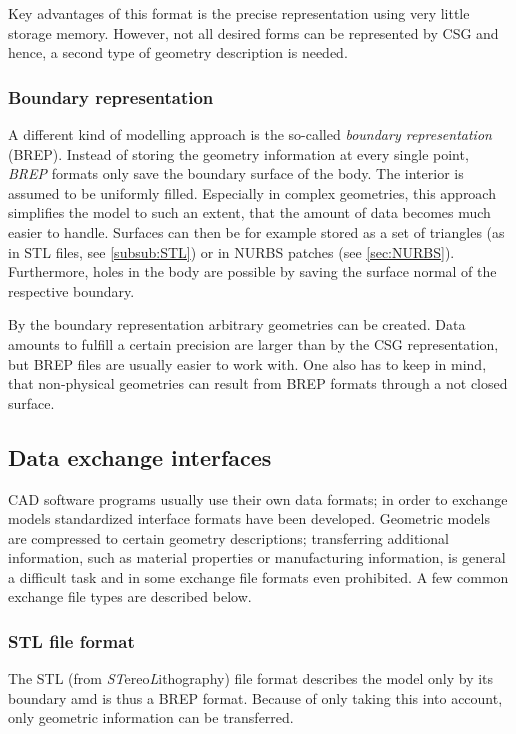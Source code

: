 Key advantages of this format is the precise representation using very little storage memory. However, not all desired forms can be represented by CSG and hence, a second type of geometry description is needed. 
\subsubsection{Boundary representation}
A different kind of modelling approach is the so-called \emph{boundary representation} (BREP). Instead of storing the geometry information at every single point, \emph{BREP} formats only save the boundary surface of the body. The interior is assumed to be uniformly filled. Especially in complex geometries, this approach simplifies the model to such an extent, that the amount of data becomes much easier to handle. Surfaces can then be for example stored as a set of triangles (as in STL files, see \autoref{subsub:STL}) or in NURBS patches (see \autoref{sec:NURBS}).
Furthermore, holes in the body are possible by saving the surface normal of the respective boundary. 

By the boundary representation arbitrary geometries can be created. Data amounts to fulfill a certain precision are larger than by the CSG representation, but BREP files are usually easier to work with. One also has to keep in mind, that non-physical geometries can result from BREP formats through a not closed surface.
\subsection{Data exchange interfaces}
CAD software programs usually use their own data formats; in order to exchange models standardized interface formats have been developed. Geometric models are compressed to certain geometry descriptions; transferring additional information, such as material properties or manufacturing information, is general a difficult task and in some exchange file formats even prohibited. A few common exchange file types are described below.
\subsubsection{STL file format} \label{subsub:STL}
The STL (from \emph{ST}ereo\emph{L}ithography) file format describes the model only by its boundary amd is thus a BREP format. Because of only taking this into account, only geometric information can be transferred. 

